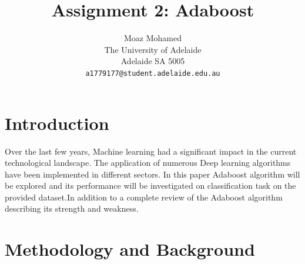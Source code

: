 \documentclass[10pt,twocolumn,letterpaper]{article}
\begin{document}
\title{Assignment 2: Adaboost}

\author{Moaz Mohamed\\
The University of Adelaide\\
Adelaide SA 5005\\
{\tt\small a1779177@student.adelaide.edu.au}

}

\maketitle


\section{Introduction}

Over the last few years, Machine learning had a significant impact in the current technological landscape. 
The application of numerous Deep learning algorithms have been implemented in different sectors. In this paper Adaboost algorithm will be explored and its performance will be investigated on classification task on the provided dataset.In addition to a complete review of the Adaboost algorithm describing its strength and weakness.
\section{Methodology and Background}
\end{document}
